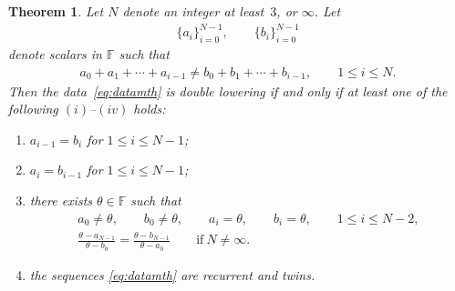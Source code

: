 \documentclass[pdftex]{sigma}
\numberwithin{equation}{section}
\newtheorem{Theorem}{Theorem}[section]
\begin{document}
\begin{Theorem}\label{thm:hr}
Let $N$ denote an integer at least~$3$, or $\infty$. Let
\begin{gather}
\lbrace a_i \rbrace_{i=0}^{N-1}, \qquad
\lbrace b_i \rbrace_{i=0}^{N-1} \label{eq:datamth}
\end{gather}
denote scalars in $\mathbb F$ such that
\begin{gather}
a_0 + a_1 + \cdots + a_{i-1} \not=
b_0 + b_1 + \cdots + b_{i-1}, \qquad 1 \leq i \leq N.
\label{eq:dontforget}
\end{gather}
Then the data~\eqref{eq:datamth} is double lowering if and only if at least one
of the following $(i)$--$(iv)$ holds:
\begin{enumerate}\itemsep=0pt
\item[$(i)$] $a_{i-1}= b_i$ for $1 \leq i \leq N-1$;
\item[$(ii)$] $a_{i}= b_{i-1}$ for $1 \leq i \leq N-1$;
\item[$(iii)$] there exists $\theta \in \mathbb F$ such that
\begin{gather*}
 a_0 \not=\theta, \qquad b_0 \not=\theta, \qquad
 a_i = \theta, \qquad b_i = \theta, \qquad 1 \leq i \leq N-2,\\
\frac{\theta- a_{N-1}}{\theta-b_0} =\frac{\theta- b_{N-1}}{\theta-a_0}
 \qquad
\text{if} \ N\not=\infty.
\end{gather*}
\item[$(iv)$] the sequences \eqref{eq:datamth} are recurrent and twins.
\end{enumerate}
\end{Theorem}
\end{document}
